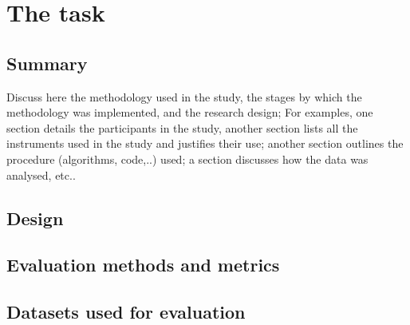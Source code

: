 
\chapter{The task}
\label{chap:task}
\ifpdf
    \graphicspath{{EvaluationTask/Figures/PNG/}{EvaluationTask/Figures/PDF/}{EvaluationTask/Figures/}}
\else
    \graphicspath{{EvaluationTask/Figures/EPS/}{EvaluationTask/Figures/}}
\fi


\section*{Summary}
Discuss here the methodology used in the study, the stages by which the methodology was implemented, and the research design; For examples, one section details the participants in the study, another section lists all the instruments used in the study and justifies their use; another section outlines the procedure (algorithms, code,..) used; a section discusses how the data was analysed, etc..


\section{Design} 
\label{sec:design}
\section{Evaluation methods and metrics} 
\label{sec:evalmethods}
\section{Datasets used for evaluation} 
\label{sec:datasets}
